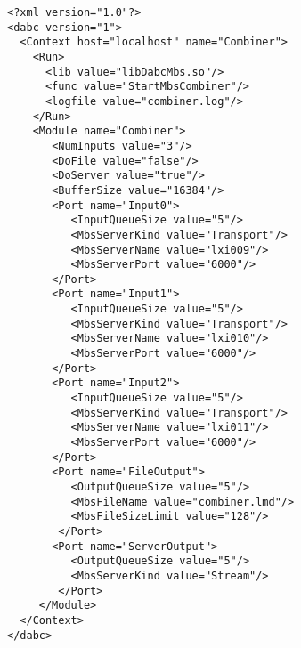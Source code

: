 \begin{small}
\begin{verbatim}
<?xml version="1.0"?>
<dabc version="1">
  <Context host="localhost" name="Combiner">
    <Run>
      <lib value="libDabcMbs.so"/>
      <func value="StartMbsCombiner"/>
      <logfile value="combiner.log"/>
    </Run>
    <Module name="Combiner">
       <NumInputs value="3"/>
       <DoFile value="false"/>
       <DoServer value="true"/>
       <BufferSize value="16384"/>
       <Port name="Input0">
          <InputQueueSize value="5"/>
          <MbsServerKind value="Transport"/>
          <MbsServerName value="lxi009"/>
          <MbsServerPort value="6000"/>
       </Port>
       <Port name="Input1">
          <InputQueueSize value="5"/>
          <MbsServerKind value="Transport"/>
          <MbsServerName value="lxi010"/>
          <MbsServerPort value="6000"/>
       </Port>
       <Port name="Input2">
          <InputQueueSize value="5"/>
          <MbsServerKind value="Transport"/>
          <MbsServerName value="lxi011"/>
          <MbsServerPort value="6000"/>
       </Port>
       <Port name="FileOutput">
          <OutputQueueSize value="5"/>
          <MbsFileName value="combiner.lmd"/>
          <MbsFileSizeLimit value="128"/>
        </Port>
       <Port name="ServerOutput">
          <OutputQueueSize value="5"/>
          <MbsServerKind value="Stream"/>
        </Port>
     </Module>
  </Context>
</dabc>
\end{verbatim}
\end{small}

